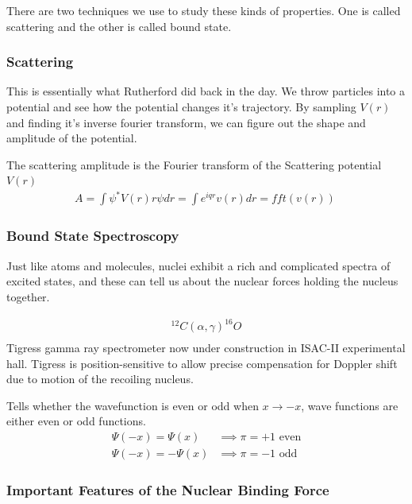 \documentclass[english, 11pt]{article}
\begin{document}
There are two techniques we use to study these kinds of properties. One is called scattering and the other is called bound state.

\subsubsection*{Scattering}

This is essentially what Rutherford did back in the day. We throw particles into a potential and see how the potential changes it's trajectory. By sampling $V(r)$ and finding it's inverse fourier transform, we can figure out the shape and amplitude of the potential.

\begin{defn}
The scattering amplitude is the Fourier transform of the Scattering potential $V(r)$
\begin{align*}
  A = \int \psi^{*}V(r)r\psi dr = \int e^{iqr}v(r)dr = fft(v(r))\
\end{align*}
\end{defn}

\subsubsection{Bound State Spectroscopy}
Just like atoms and molecules, nuclei exhibit a rich and complicated spectra of excited states, and these can tell us about the nuclear forces holding the nucleus together.

\begin{align*}
  ^12C(\alpha,\gamma)^16O\\
\end{align*}
Tigress gamma ray spectrometer now under construction in ISAC-II experimental hall. Tigress is position-sensitive to allow precise compensation for Doppler shift due to motion of the recoiling nucleus.

\begin{defn}[Parity]
Tells whether the wavefunction is even or odd when $x \rightarrow -x$, wave functions are either even or odd functions.
\begin{align*}
  \Psi(-x) = \Psi(x) &\implies \pi = +1 \text{ even}\\
  \Psi(-x) = -\Psi(x) &\implies \pi = -1 \text{ odd}
\end{align*}
\end{defn}

\subsubsection{Important Features of the Nuclear Binding Force}
\end{document}
